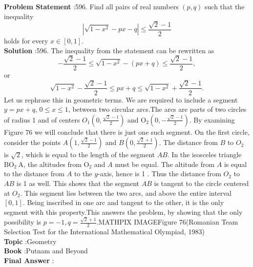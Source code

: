 \documentclass[10pt]{article}
\begin{document}
\textbf{Problem Statement} :596. Find all pairs of real numbers $(p, q)$ such that the inequality$$ \left|\sqrt{1-x^{2}}-p x-q\right| \leq \frac{\sqrt{2}-1}{2} $$holds for every $x \in[0,1]$.\\
\textbf{Solution} :596. The inequality from the statement can be rewritten as$$ -\frac{\sqrt{2}-1}{2} \leq \sqrt{1-x^{2}}-(p x+q) \leq \frac{\sqrt{2}-1}{2}, $$or$$ \sqrt{1-x^{2}}-\frac{\sqrt{2}-1}{2} \leq p x+q \leq \sqrt{1-x^{2}}+\frac{\sqrt{2}-1}{2} . $$Let us rephrase this in geometric terms. We are required to include a segment $y=p x+q$, $0 \leq x \leq 1$, between two circular arcs.The arcs are parts of two circles of radius 1 and of centers $O_{1}\left(0, \frac{\sqrt{2}-1}{2}\right)$ and $\mathrm{O}_{2}\left(0,-\frac{\sqrt{2}-1}{2}\right)$. By examining Figure 76 we will conclude that there is just one such segment. On the first circle, consider the points $A\left(1, \frac{\sqrt{2}-1}{2}\right)$ and $B\left(0, \frac{\sqrt{2}+1}{2}\right)$. The distance from $B$ to $O_{2}$ is $\sqrt{2}$, which is equal to the length of the segment $A B$. In the isosceles triangle $\mathrm{BO}_{2} \mathrm{~A}$, the altitudes from $\mathrm{O}_{2}$ and $A$ must be equal. The altitude from $A$ is equal to the distance from $A$ to the $y$-axis, hence is 1 . Thus the distance from $O_{2}$ to $A B$ is 1 as well. This shows that the segment $A B$ is tangent to the circle centered at $O_{2}$. This segment lies between the two arcs, and above the entire interval $[0,1]$. Being inscribed in one arc and tangent to the other, it is the only segment with this property.This answers the problem, by showing that the only possibility is $p=-1, q=\frac{\sqrt{2}+1}{2}$.MATHPIX IMAGEFigure 76(Romanian Team Selection Test for the International Mathematical Olympiad, 1983) \\
\textbf{Topic} :Geometry\\
\textbf{Book} :Putnam and Beyond\\
\textbf{Final Answer} :\\
\end{document}
